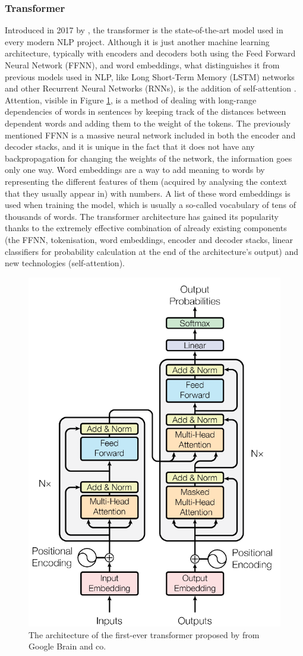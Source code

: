 \documentclass{l4proj}
\begin{document}
\subsubsection{Transformer}

Introduced in 2017 by \citeauthor{NLPTransformer}, the transformer is the state-of-the-art model used in every modern NLP project. Although it is just another machine learning architecture, typically with encoders and decoders both using the Feed Forward Neural Network (FFNN), and word embeddings, what distinguishes it from previous models used in NLP, like Long Short-Term Memory (LSTM) networks and other Recurrent Neural Networks (RNNs), is the addition of self-attention \citep{TransformerExplained}. Attention, visible in Figure \ref{fig:transformer}, is a method of dealing with long-range dependencies of words in sentences by keeping track of the distances between dependent words and adding them to the weight of the tokens. The previously mentioned FFNN is a massive neural network included in both the encoder and decoder stacks, and it is unique in the fact that it does not have any backpropagation for changing the weights of the network, the information goes only one way. Word embeddings are a way to add meaning to words by representing the different features of them (acquired by analysing the context that they usually appear in) with numbers. A list of these word embeddings is used when training the model, which is usually a so-called vocabulary of tens of thousands of words. The transformer architecture has gained its popularity thanks to the extremely effective combination of already existing components (the FFNN, tokenisation, word embeddings, encoder and decoder stacks, linear classifiers for probability calculation at the end of the architecture's output) and new technologies (self-attention).

\begin{figure}
    \centering
    \includegraphics[width=0.5\linewidth]{images/Background/transformer.png}    

    \caption{The architecture of the first-ever transformer proposed by \cite{NLPTransformer} from Google Brain and co.}
    \label{fig:transformer} 
\end{figure}
\end{document}
